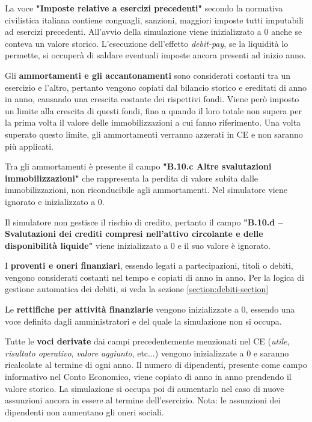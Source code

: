 \documentclass{article}
\begin{document}
La voce \textbf{"Imposte relative a esercizi precedenti"} secondo la normativa civilistica italiana contiene conguagli, sanzioni, maggiori imposte tutti imputabili ad esercizi precedenti. All'avvio della simulazione viene inizializzato a 0 anche se conteva un valore storico. L'esecuzione dell'effetto \textit{debit-pay}, se la liquidità lo permette, si occuperà di saldare eventuali imposte ancora presenti ad inizio anno. 

Gli \textbf{ammortamenti e gli accantonamenti} sono considerati costanti tra un esercizio e l'altro, pertanto vengono copiati dal bilancio storico e ereditati di anno in anno, causando una crescita costante dei rispettivi fondi. Viene però imposto un limite alla crescita di questi fondi, fino a quando il loro totale non supera per la prima volta il valore delle immobilizzazioni a cui fanno riferimento. 
Una volta superato questo limite, gli ammortamenti verranno azzerati in CE e non saranno più applicati. 

Tra gli ammortamenti è presente il campo \textbf{"B.10.c Altre svalutazioni immobilizzazioni"} che rappresenta la perdita di valore subita dalle immobilizzazioni, non riconducibile agli ammortamenti. Nel simulatore viene ignorato e inizializzato a 0. 

Il simulatore non gestisce il rischio di credito, pertanto il campo \textbf{"B.10.d – Svalutazioni dei crediti compresi nell'attivo circolante e delle disponibilità liquide"} viene inizializzato a 0 e il suo valore è ignorato. 

I \textbf{proventi e oneri finanziari}, essendo legati a partecipazioni, titoli o debiti, vengono considerati costanti nel tempo e copiati di anno in anno. Per la logica di gestione automatica dei debiti, si veda la sezione \ref{section:debiti-section}

Le \textbf{rettifiche per attività finanziarie} vengono inizializzate a 0, essendo una voce definita dagli amministratori e del quale la simulazione non si occupa. 


Tutte le \textbf{voci derivate} dai campi precedentemente menzionati nel CE (\textit{utile}, \textit{risultato operativo}, \textit{valore aggiunto}, etc...) vengono inizializzate a 0 e saranno ricalcolate al termine di ogni anno. 
Il numero di dipendenti, presente come campo informativo nel Conto Economico, viene copiato di anno in anno prendendo il valore storico. La simulazione si occupa poi di aumentarlo nel caso di nuove assunzioni ancora in essere al termine dell'esercizio. 
Nota: le assunzioni dei dipendenti non aumentano gli oneri sociali. 
\end{document}
